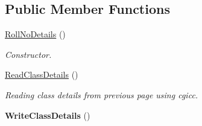 \subsection*{Public Member Functions}
\begin{DoxyCompactItemize}
\item 
\hyperlink{classRollNoDetails_aef927fa87d8ab659f6a241290936980c}{Roll\-No\-Details} ()
\begin{DoxyCompactList}\small\item\em Constructor. \end{DoxyCompactList}\item 
\hyperlink{classRollNoDetails_a218c683c86ee19788b868a08af6e210f}{Read\-Class\-Details} ()
\begin{DoxyCompactList}\small\item\em Reading class details from previous page using cgicc. \end{DoxyCompactList}\item 
\hypertarget{classRollNoDetails_ade931d9c426fbd3fd5d8db72b3a55289}{{\bfseries Write\-Class\-Details} ()}\label{classRollNoDetails_ade931d9c426fbd3fd5d8db72b3a55289}


\end{DoxyCompactItemize}

